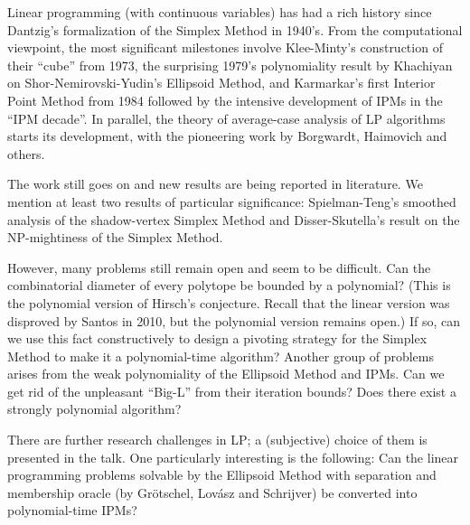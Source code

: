 


\begin{Abstrakt}
Linear programming (with continuous variables) has had a rich history since Dantzig’s formalization of the Simplex Method in 1940’s. From the computational viewpoint, the most significant milestones involve Klee-Minty’s construction of their “cube” from 1973, the surprising 1979’s polynomiality result by Khachiyan on Shor-Nemirovski-Yudin’s Ellipsoid Method, and Karmarkar’s first Interior Point Method from 1984 followed by the intensive development of IPMs in the “IPM decade”. In parallel, the theory of average-case analysis of LP algorithms starts its development, with the pioneering work by Borgwardt, Haimovich and others.

The work still goes on and new results are being reported in literature. We mention at least two results of particular significance: Spielman-Teng’s smoothed analysis of the shadow-vertex Simplex Method and Disser-Skutella’s result on the NP-mightiness of the Simplex Method.

However, many problems still remain open and seem to be difficult. Can the combinatorial diameter of every polytope be bounded by a polynomial? (This is the polynomial version of Hirsch’s conjecture. Recall that the linear  version was disproved by Santos in 2010, but the polynomial version remains open.) If so, can we use this fact constructively to design a pivoting strategy for the Simplex Method to make it a polynomial-time algorithm? Another group of problems arises from the weak polynomiality of the Ellipsoid Method and IPMs. Can we get rid of the unpleasant “Big-L” from their iteration bounds? Does there exist a strongly polynomial algorithm?

There are further research challenges in LP; a (subjective) choice of them is presented in the talk.  One particularly interesting is the following: Can the linear programming problems solvable by the Ellipsoid Method with separation and membership oracle (by Grötschel, Lovász and Schrijver) be converted into polynomial-time IPMs?

\end{Abstrakt}


\clearpage